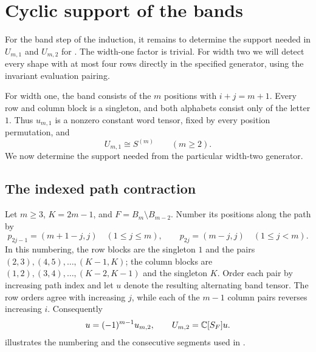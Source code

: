 \section{Cyclic support of the bands}\label{sec:path-band}

For the band step of the induction, it remains to determine the support
needed in $U_{m,1}$ and $U_{m,2}$ for .
The width-one factor is trivial.
For width two we will detect every shape with at most four rows directly
in the specified generator, using the invariant evaluation pairing.

For width one, the band consists of the $m$ positions with $i+j=m+1$.
Every row and column block is a singleton, and both alphabets consist only
of the letter $1$. Thus $u_{m,1}$ is a nonzero constant word tensor, fixed
by every position permutation, and
\begin{equation}\label{path:one-band}
 U_{m,1}\cong S^{(m)} \qquad (m\geq2).
\end{equation}
We now determine the support needed from the particular width-two
generator.

\subsection{The indexed path contraction}

Let $m\geq3$, $K=2m-1$, and $F=B_m\setminus B_{m-2}$.
Number its positions along the path by
\begin{equation}\label{path:positions}
 p_{2j-1}=(m+1-j,j)\quad(1\leq j\leq m),\qquad
 p_{2j}=(m-j,j)\quad(1\leq j<m).
\end{equation}
In this numbering, the row blocks are the singleton $1$ and the pairs
$(2,3),(4,5),\ldots,(K-1,K)$; the column blocks are
$(1,2),(3,4),\ldots,(K-2,K-1)$ and the singleton $K$.
Order each pair by increasing path index and let $u$ denote the resulting
alternating band tensor. The row orders agree with increasing $j$, while
each of the $m-1$ column pairs reverses increasing $i$. Consequently
\begin{equation}\label{path:generator-sign}
 u=(-1)^{m-1}u_{m,2},\qquad U_{m,2}=\mathbb C[S_F]u.
\end{equation}
 illustrates the numbering and the consecutive
segments used in .

